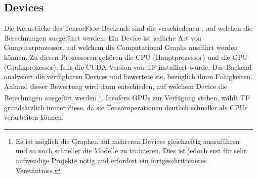\begin{appendices}
\section*{Devices}
Die Kernstücke des TensorFlow Backends sind die verschiedenen , auf
welchen die Berechnungen ausgeführt werden. Ein Device ist jedliche Art von
Computerprozessor, auf welchem die Computational Graphs ausführt werden können.
Zu diesen Prozessoren gehören die CPU (Hauptprozessor) und die GPU
(Grafikprozessor), falls die CUDA-Version von TF installiert wurde.
\para{}
Das Backend analysiert die verfügbaren Devices und bewertete sie, bezüglich
ihren Fähigkeiten. Anhand dieser Bewertung wird dann entschieden, auf
welchem Device die Berechnugen ausgefürt werden%
\footnote{
  Es ist möglich die Graphen auf mehreren Devices gleichzeitig auszuführen und
  so noch schneller die Modelle zu trainieren. Dies ist jedoch erst für sehr
  aufwendige Projekte nötig und erfordert ein fortgeschritteneres Verstäntniss.
}.
Insofern GPUs zur Verfügung stehen, wählt TF grundsätzlich immer diese, da
sie Tensoroperationen deutlich schneller als CPUs verarbeiten können.


\end{appendices}
